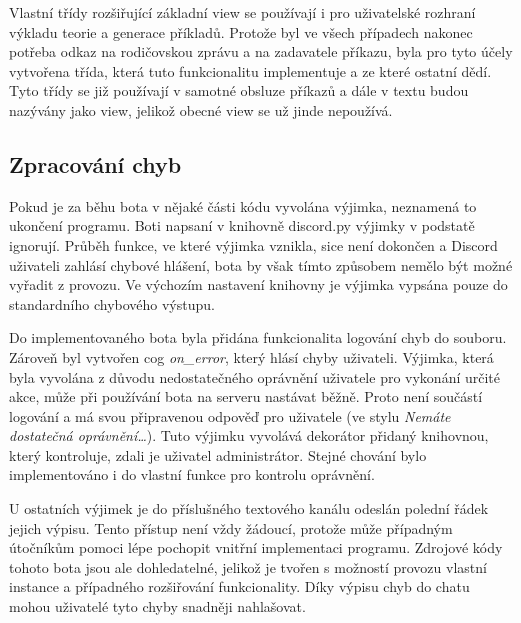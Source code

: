 \documentclass[FM]{tulthesis}
\begin{document}
	Vlastní třídy rozšiřující základní view se používají i pro uživatelské rozhraní výkladu teorie a generace příkladů. Protože byl ve všech případech nakonec potřeba odkaz na rodičovskou zprávu a na zadavatele příkazu, byla pro tyto účely vytvořena třída, která tuto funkcionalitu implementuje a ze které ostatní dědí. Tyto třídy se již používají v samotné obsluze příkazů a dále v textu budou nazývány jako view, jelikož obecné view se už jinde nepoužívá.
	
		
	
	\subsection{Zpracování chyb}
	
	Pokud je za běhu bota v nějaké části kódu vyvolána výjimka, neznamená to ukončení programu. Boti napsaní v knihovně discord.py výjimky v podstatě ignorují. Průběh funkce, ve které výjimka vznikla, sice není dokončen a Discord uživateli zahlásí chybové hlášení, bota by však tímto způsobem nemělo být možné vyřadit z provozu. Ve výchozím nastavení knihovny je výjimka vypsána pouze do standardního chybového výstupu.
	
	Do implementovaného bota byla přidána funkcionalita logování chyb do souboru. Zároveň byl vytvořen cog \textit{on\_error}, který hlásí chyby uživateli. Výjimka, která byla vyvolána z důvodu nedostatečného oprávnění uživatele pro vykonání určité akce, může při používání bota na serveru nastávat běžně. Proto není součástí logování a má svou připravenou odpověď pro uživatele (ve stylu \textit{Nemáte dostatečná oprávnění\dots}). Tuto výjimku vyvolává dekorátor přidaný knihovnou, který kontroluje, zdali je uživatel administrátor. Stejné chování bylo implementováno i do vlastní funkce pro kontrolu oprávnění.
	
	U ostatních výjimek je do příslušného textového kanálu odeslán polední řádek jejich výpisu. Tento přístup není vždy žádoucí, protože může případným útočníkům pomoci lépe pochopit vnitřní implementaci programu. Zdrojové kódy tohoto bota jsou ale dohledatelné, jelikož je tvořen s možností provozu vlastní instance a případného rozšiřování funkcionality. Díky výpisu chyb do chatu mohou uživatelé tyto chyby snadněji nahlašovat.
	
\end{document}
